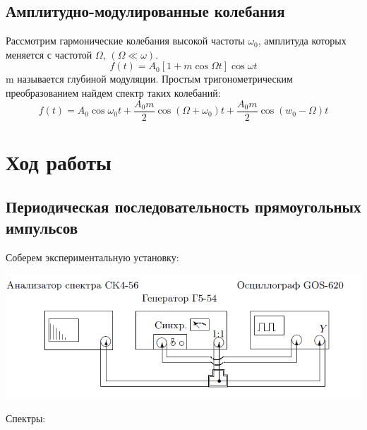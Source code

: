 \documentclass[a4paper,12pt]{article}
\begin{document}
		\subsection{Амплитудно-модулированные колебания}
		Рассмотрим гармонические колебания высокой частоты $\omega_0$, амплитуда которых меняется с частотой $\Omega$, $\left(\Omega \ll \omega\right)$. 
		$$
		f(t) = A_0\left[1+m\cos\Omega t\right]\cos\omega t
		$$
		m называется глубиной модуляции. Простым тригонометрическим преобразованием найдем спектр таких колебаний:
		$$
		f(t) = A_0\cos\omega_0t + \frac{A_0m}{2}\cos\left(\Omega+\omega_0\right)t+\frac{A_0m}{2}\cos\left(w_0-\Omega\right)t
		$$
	\section{Ход работы}
		\subsection{Периодическая последовательность прямоугольных импульсов}
		Соберем экспериментальную установку:
		
		\includegraphics[width = 0.7\linewidth]{scheme1}
		
		Спектры:
		
\end{document}
